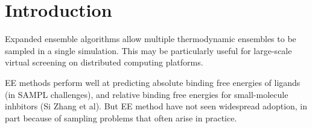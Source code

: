\documentclass[%
 aip,
rsi,%
 amsmath,amssymb,
 reprint,%
]{revtex4-1}
\begin{document}
\maketitle


\section*{Introduction}


Expanded ensemble algorithms allow multiple thermodynamic ensembles to be sampled in a single simulation.   This may be particularly useful for large-scale virtual screening on distributed computing platforms.

EE methods perform well at predicting absolute binding free energies of ligands (in SAMPL challenges), and relative binding free energies for small-molecule inhbitors (Si Zhang et al).   But EE method have not seen widespread adoption, in part because of sampling problems that often arise in practice.
\end{document}
